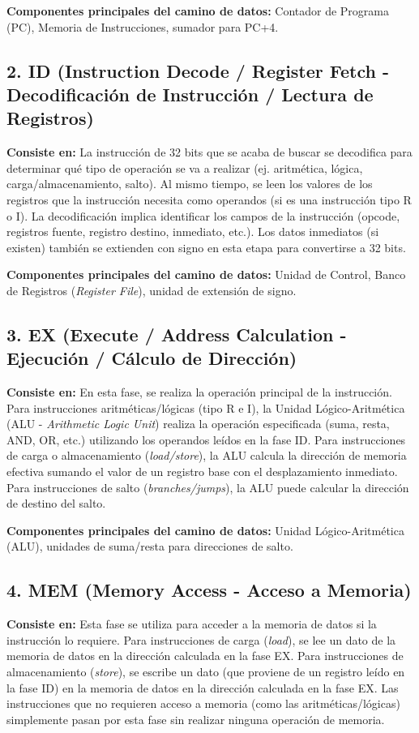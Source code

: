 \documentclass{article}
\begin{document}
\textbf{Componentes principales del camino de datos:} Contador de Programa (PC), Memoria de Instrucciones, sumador para PC+4.

\subsection*{2. ID (Instruction Decode / Register Fetch - Decodificación de Instrucción / Lectura de Registros)}
\textbf{Consiste en:} La instrucción de 32 bits que se acaba de buscar se decodifica para determinar qué tipo de operación se va a realizar (ej. aritmética, lógica, carga/almacenamiento, salto). Al mismo tiempo, se leen los valores de los registros que la instrucción necesita como operandos (si es una instrucción tipo R o I). La decodificación implica identificar los campos de la instrucción (opcode, registros fuente, registro destino, inmediato, etc.). Los datos inmediatos (si existen) también se extienden con signo en esta etapa para convertirse a 32 bits.

\textbf{Componentes principales del camino de datos:} Unidad de Control, Banco de Registros (\textit{Register File}), unidad de extensión de signo.

\subsection*{3. EX (Execute / Address Calculation - Ejecución / Cálculo de Dirección)}
\textbf{Consiste en:} En esta fase, se realiza la operación principal de la instrucción. Para instrucciones aritméticas/lógicas (tipo R e I), la Unidad Lógico-Aritmética (ALU - \textit{Arithmetic Logic Unit}) realiza la operación especificada (suma, resta, AND, OR, etc.) utilizando los operandos leídos en la fase ID. Para instrucciones de carga o almacenamiento (\textit{load/store}), la ALU calcula la dirección de memoria efectiva sumando el valor de un registro base con el desplazamiento inmediato. Para instrucciones de salto (\textit{branches/jumps}), la ALU puede calcular la dirección de destino del salto.

\textbf{Componentes principales del camino de datos:} Unidad Lógico-Aritmética (ALU), unidades de suma/resta para direcciones de salto.

\subsection*{4. MEM (Memory Access - Acceso a Memoria)}
\textbf{Consiste en:} Esta fase se utiliza para acceder a la memoria de datos si la instrucción lo requiere. Para instrucciones de carga (\textit{load}), se lee un dato de la memoria de datos en la dirección calculada en la fase EX. Para instrucciones de almacenamiento (\textit{store}), se escribe un dato (que proviene de un registro leído en la fase ID) en la memoria de datos en la dirección calculada en la fase EX. Las instrucciones que no requieren acceso a memoria (como las aritméticas/lógicas) simplemente pasan por esta fase sin realizar ninguna operación de memoria.
\end{document}
